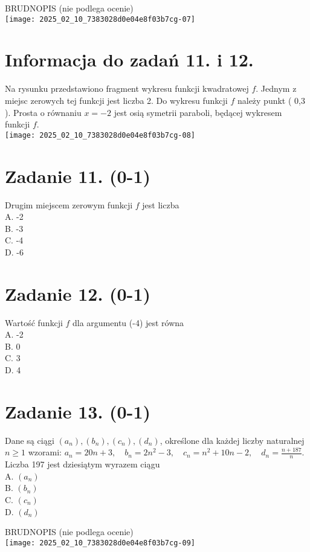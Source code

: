 \documentclass[10pt]{article}
\begin{document}
BRUDNOPIS (nie podlega ocenie)\\
\texttt{[image: 2025\_02\_10\_7383028d0e04e8f03b7cg-07]}

\section*{Informacja do zadań 11. i 12.}
Na rysunku przedstawiono fragment wykresu funkcji kwadratowej \(f\). Jednym z miejsc zerowych tej funkcji jest liczba 2. Do wykresu funkcji \(f\) należy punkt ( 0,3 ). Prosta o równaniu \(x=-2\) jest osią symetrii paraboli, będącej wykresem funkcji \(f\).\\
\texttt{[image: 2025\_02\_10\_7383028d0e04e8f03b7cg-08]}

\section*{Zadanie 11. (0-1)}
Drugim miejscem zerowym funkcji \(f\) jest liczba\\
A. -2\\
B. -3\\
C. -4\\
D. -6

\section*{Zadanie 12. (0-1)}
Wartość funkcji \(f\) dla argumentu (-4) jest równa\\
A. -2\\
B. 0\\
C. 3\\
D. 4

\section*{Zadanie 13. (0-1)}
Dane są ciągi \(\left(a_{n}\right),\left(b_{n}\right),\left(c_{n}\right),\left(d_{n}\right)\), określone dla każdej liczby naturalnej \(n \geq 1\) wzorami: \(a_{n}=20 n+3, \quad b_{n}=2 n^{2}-3, \quad c_{n}=n^{2}+10 n-2, \quad d_{n}=\frac{n+187}{n}\). Liczba 197 jest dziesiątym wyrazem ciągu\\
A. \(\left(a_{n}\right)\)\\
B. \(\left(b_{n}\right)\)\\
C. \(\left(c_{n}\right)\)\\
D. \(\left(d_{n}\right)\)

BRUDNOPIS (nie podlega ocenie)\\
\texttt{[image: 2025\_02\_10\_7383028d0e04e8f03b7cg-09]}
\end{document}
